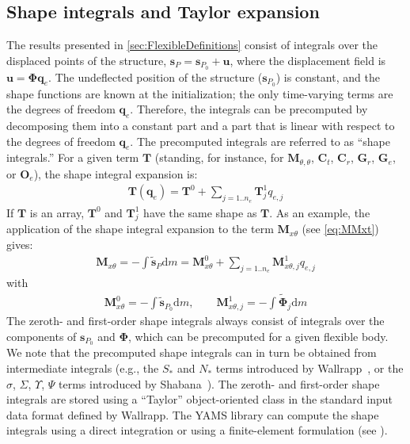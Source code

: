 \documentclass[wes, manuscript]{copernicus}
\renewcommand{\d}{\mathrm{d}}
\renewcommand{\v}[1]{\boldsymbol{#1}}
\newcommand{\m}[1]{\boldsymbol{#1}}
\newcommand{\s}{\v{s}}
\renewcommand{\d}{\mathrm{d}}
\newcommand{\dm}{\d{m}}
\begin{document}
\subsection{Shape integrals and Taylor expansion}
\label{sec:TaylorExpansionShapeIntegrals}
The results presented in \autoref{sec:FlexibleDefinitions} consist of integrals over the displaced points of the structure, $\v{s}_P=\s_{P_0} + \v{u}$, where the displacement field is $\v{u}=\m{\Phi} \v{q}_e$. The undeflected position of the structure ($\v{s}_{P_0}$) is constant, and the shape functions are known at the initialization; the only time-varying terms are the degrees of freedom $\v{q}_e$. Therefore, the integrals can be precomputed by decomposing them into a constant part and a part that is linear with respect to the degrees of freedom $\v{q}_e$. The precomputed integrals are referred to as ``shape integrals.'' For a given term $\v{T}$ (standing, for instance, for $\m{M}_{\theta,\theta}$, $\m{C}_t$, $\m{C}_r$, $\v{G}_r$, $\v{G}_e$, or $\v{O}_e$), the shape integral expansion is:
\begin{align}
\m{T}(\v{q}_e) = \m{T}^0 
    + \sum\limits_{j=1..n_e} \m{T}^1_j q_{e,j}
    \label{eq:T01}
\end{align}
If $\m{T}$ is an array, $\m{T}^0$ and $\m{T}^1_j$ have the same shape as $\m{T}$.
As an example, the application of the shape integral expansion to the term $\m{M}_{x\theta}$ (see \autoref{eq:MMxt}) gives:
\begin{align}
   \m{M}_{x\theta}=-\int \tilde{\v{s}}_P \dm =  \m{M}_{x\theta}^0 +\sum\limits_{j=1..n_e}     {\m{M}_{x\theta,j}^1} q_{e,j}
\end{align}
with
\begin{align}
    \m{M}_{x\theta}^0 = -\int \tilde{\v{s}}_{P_0} \dm 
        ,\qquad
    \m{M}_{x\theta,j}^1 = -\int \tilde{\v{\Phi}}_j \dm 
\end{align}
The zeroth- and first-order shape integrals always consist of integrals over the components of $\s_{P_0}$ and $\m{\Phi}$, which can be precomputed for a given flexible body.
We note that the precomputed shape integrals can in turn be obtained from intermediate integrals (e.g., the $S_*$ and $N_*$ terms introduced by Wallrapp~\citep{Wallrapp:1994}, or the $\sigma$, $\Sigma$, $\Upsilon$, $\Psi$ terms introduced by Shabana~\citep{shabana:book}).  
The zeroth- and first-order shape integrals are stored using a ``Taylor'' object-oriented class in the standard input data format defined by Wallrapp. The YAMS library can compute the shape integrals using a direct integration or using a finite-element formulation (see \cite{Schwertassek:book}).
\end{document}
